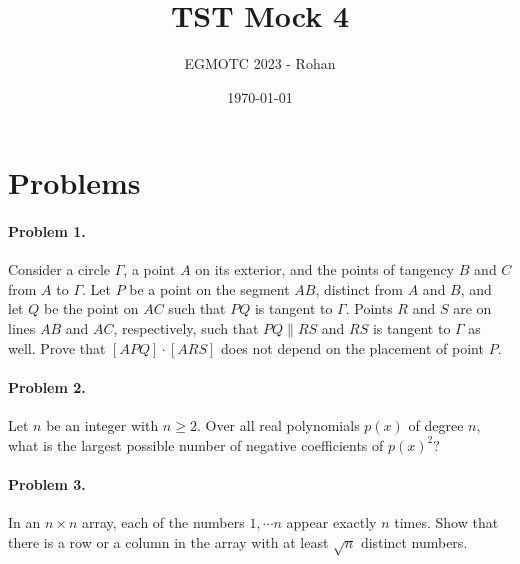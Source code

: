 \documentclass[12pt]{article}
\title{TST Mock 4}
\author{EGMOTC 2023 - Rohan}
\date{\today}
\begin{document}
\maketitle

\newcommand{\localtextbulletone}{\textcolor{black}{\raisebox{.45ex}{\rule{.6ex}{.6ex}}}}
\renewcommand{\labelitemi}{\localtextbulletone}

\section*{Problems}
\vspace{0cm}
\thispagestyle{empty}

\paragraph{\textbf{Problem 1.}} Consider a circle $\Gamma$, a point $A$ on its exterior, and the points of tangency $B$ and $C$ from $A$ to $\Gamma$. Let $P$ be a point on the segment $AB$, distinct from $A$ and $B$, and let $Q$ be the point on $AC$ such that $PQ$ is tangent to $\Gamma$. Points $R$ and $S$ are on lines $AB$ and $AC$, respectively, such that $PQ\parallel RS$ and $RS$ is tangent to $\Gamma$ as well. Prove that $[APQ]\cdot[ARS]$ does not depend on the placement of point $P$.
\paragraph{\textbf{Problem 2.}} Let $n$ be an integer with $n\geq 2.$ Over all real polynomials $p(x)$ of degree $n,$ what is the largest possible number of negative coefficients of $p(x)^2?$
\paragraph{\textbf{Problem 3.}} In an $n\times n$ array, each of the numbers $1,\cdots n$ appear exactly $n$ times. Show that there is a row or a column in the array with at least $\sqrt{n}$ distinct numbers.
\end{document}
